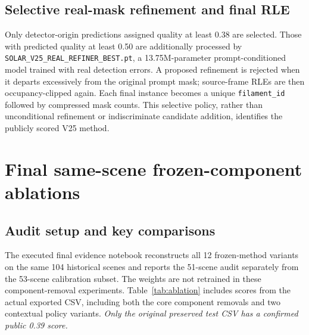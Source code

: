 \documentclass[11pt,a4paper]{article}
\begin{document}
\subsection{Selective real-mask refinement and final RLE}
Only detector-origin predictions assigned quality at least 0.38 are selected. Those with predicted quality at least 0.50 are additionally processed by \texttt{SOLAR\_V25\_REAL\_REFINER\_BEST.pt}, a 13.75M-parameter prompt-conditioned model trained with real detection errors. A proposed refinement is rejected when it departs excessively from the original prompt mask; source-frame RLEs are then occupancy-clipped again. Each final instance becomes a unique \texttt{filament\_id} followed by compressed mask counts. This selective policy, rather than unconditional refinement or indiscriminate candidate addition, identifies the publicly scored V25 method.

\section{Final same-scene frozen-component ablations}
\subsection{Audit setup and key comparisons}
The executed final evidence notebook reconstructs all 12 frozen-method variants on the same 104 historical scenes and reports the 51-scene audit separately from the 53-scene calibration subset. The weights are not retrained in these component-removal experiments. Table~\ref{tab:ablation} includes scores from the actual exported CSV, including both the core component removals and two contextual policy variants. \emph{Only the original preserved test CSV has a confirmed public 0.39 score.}
\end{document}
